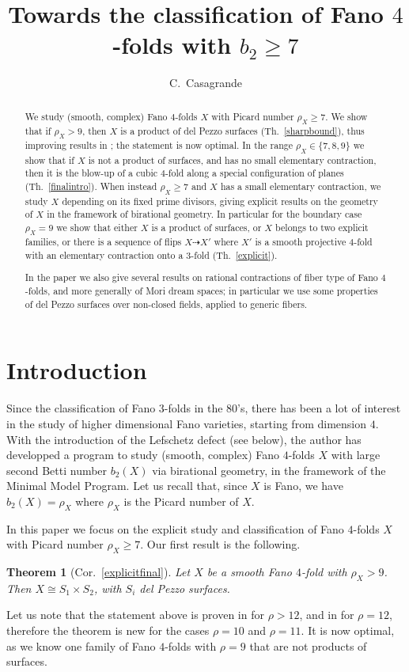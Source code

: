 \documentclass[a4paper,12pt]{amsart}
\title[Fano $4$-folds with $b_2\geq 7$]{Towards the classification of Fano $4$-folds with $b_2\geq 7$}
\author{C.~Casagrande}
\newtheorem{thm}{Theorem}[section]
\theoremstyle{definition}
\numberwithin{figure}{section}
\numberwithin{table}{section}
\begin{document}
\begin{abstract}
  We study (smooth, complex) Fano $4$-folds $X$ with Picard number $\rho_X\geq 7$. We show that if $\rho_X>9$, then $X$ is a product of del Pezzo surfaces (Th.~\ref{sharpbound}), thus improving results in \cite{32,3folds}; the statement is now optimal.  In the range $\rho_X\in\{7,8,9\}$ we show that if $X$ is not a product of surfaces, and has no small elementary contraction, then it is the blow-up of a cubic $4$-fold along a special configuration of planes
  (Th.~\ref{finalintro}). When instead $\rho_X\geq 7$ and $X$ has a small elementary contraction, we study $X$ depending on its fixed prime divisors, giving explicit results on the geometry of $X$ in the framework of birational geometry.
  In particular for the boundary case $\rho_X=9$ we show that either $X$ is a product of surfaces, or $X$ belongs to two explicit families, or there is a sequence of flips $X\dasharrow X'$ where $X'$ is a smooth projective $4$-fold with an elementary contraction onto a $3$-fold (Th.~\ref{explicit}).

  In the paper we also give several results on rational contractions of fiber type of Fano $4$-folds, and more generally of Mori dream spaces; in particular we use some properties of del Pezzo surfaces over non-closed fields, applied to generic fibers.
\end{abstract}
\maketitle
\section{Introduction}
\noindent
Since the classification of  Fano $3$-folds in the 80's, there has been a lot of interest in the study of higher dimensional Fano varieties, starting from dimension $4$. With the introduction of the Lefschetz defect (see below), the author has developped a program to study (smooth, complex) Fano $4$-folds $X$ with large second Betti number $b_2(X)$
via birational geometry, in the framework of the Minimal Model Program.  Let us recall that, since $X$ is Fano, we have $b_2(X)=\rho_X$ where $\rho_X$ is the Picard number of $X$.

In this paper we focus on the explicit study and classification of  Fano $4$-folds $X$ with Picard number $\rho_X\geq 7$. 
Our first result is the following.
\begin{thm}[Cor.~\ref{explicitfinal}]\label{sharpbound}
Let $X$ be a smooth Fano $4$-fold with  $\rho_X>9$. Then $X\cong S_1\times S_2$, with $S_i$ del Pezzo surfaces.
\end{thm}
Let us note that the statement above is proven in \cite{32} for $\rho>12$, and in \cite[Cor.~1.4]{3folds} for $\rho=12$, therefore the theorem is new for the cases $\rho=10$ and $\rho=11$. It is now optimal, as we know one family of Fano $4$-folds with $\rho=9$ that are not products of surfaces.
\end{document}
